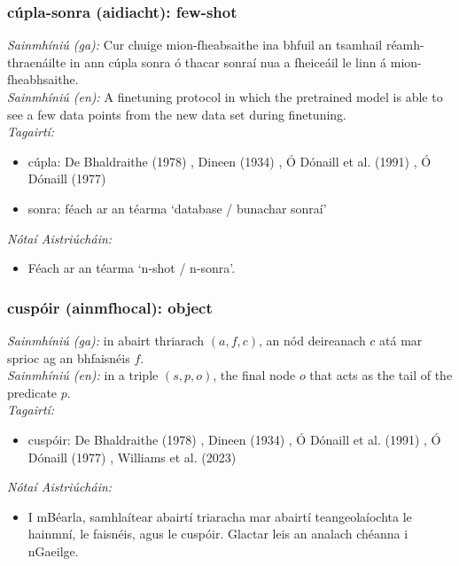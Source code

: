 \documentclass{article}
\begin{document}
\subsubsection*{cúpla-sonra (aidiacht): few-shot}
 \noindent \textit{Sainmhíniú (ga):} Cur chuige mion-fheabsaithe ina bhfuil an tsamhail réamh-thraenáilte in ann cúpla sonra ó thacar sonraí nua a fheiceáil le linn á mion-fheabhsaithe.
\\
 \noindent \textit{Sainmhíniú (en):} A finetuning protocol in which the pretrained model is able to see a few data points from the new data set during finetuning.
\\
 \noindent \textit{Tagairtí:}
\begin{itemize}
	\item cúpla: De Bhaldraithe (1978) \cite{de-bhaldraithe}, Dineen (1934) \cite{dineen}, Ó Dónaill et al. (1991) \cite{focloir-beag}, Ó Dónaill (1977) \cite{odonaill}
	\item sonra: féach ar an téarma `database / bunachar sonraí'
\end{itemize}

 \noindent \textit{Nótaí Aistriúcháin:}
\begin{itemize}
	\item Féach ar an téarma `n-shot / n-sonra'.
\end{itemize}


\subsubsection*{cuspóir (ainmfhocal): object}
 \noindent \textit{Sainmhíniú (ga):} in abairt thriarach $(a,f,c)$, an nód deireanach $c$ atá mar sprioc ag an bhfaisnéis $f$.
\\
 \noindent \textit{Sainmhíniú (en):} in a triple $(s,p,o)$, the final node $o$ that acts as the tail of the predicate $p$.
\\
 \noindent \textit{Tagairtí:}
\begin{itemize}
	\item cuspóir: De Bhaldraithe (1978) \cite{de-bhaldraithe}, Dineen (1934) \cite{dineen}, Ó Dónaill et al. (1991) \cite{focloir-beag}, Ó Dónaill (1977) \cite{odonaill}, Williams et al. (2023) \cite{storchiste}
\end{itemize}

 \noindent \textit{Nótaí Aistriúcháin:}
\begin{itemize}
	\item I mBéarla, samhlaítear abairtí triaracha mar abairtí teangeolaíochta le hainmní, le faisnéis, agus le cuspóir. Glactar leis an analach chéanna i nGaeilge.
\end{itemize}
\end{document}
